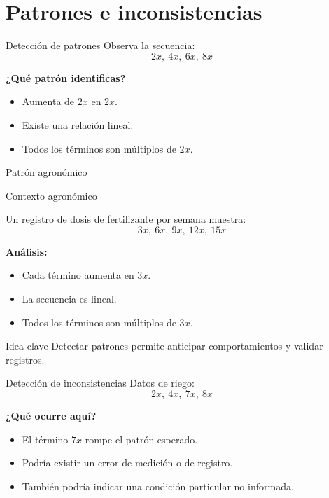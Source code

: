 \documentclass[handout,aspectratio=169,12pt]{beamer}
\newcommand{\IdeaClave}[1]{
	\begin{alertblock}{Idea clave}
		#1
	\end{alertblock}
}
\newcommand{\Agronomia}[1]{
	\begin{exampleblock}{Contexto agronómico}
		#1
	\end{exampleblock}
}
\begin{document}
	\section{Patrones e inconsistencias}
	\begin{frame}{Detección de patrones}
		Observa la secuencia:
		\[
		2x,\ 4x,\ 6x,\ 8x
		\]
		
		\pause
		\textbf{¿Qué patrón identificas?}
		\begin{itemize}
			\item Aumenta de \(2x\) en \(2x\).
			\pause
			\item Existe una relación lineal.
			\pause
			\item Todos los términos son múltiplos de \(2x\).
		\end{itemize}
	\end{frame}
	
	\begin{frame}{Patrón agronómico}
		\Agronomia{
			Un registro de dosis de fertilizante por semana muestra:
			\[
			3x,\ 6x,\ 9x,\ 12x,\ 15x
			\]
		}
		
		\pause
		\textbf{Análisis:}
		\begin{itemize}
			\item Cada término aumenta en \(3x\).
			\pause
			\item La secuencia es lineal.
			\pause
			\item Todos los términos son múltiplos de \(3x\).
		\end{itemize}
		
		\pause
		\IdeaClave{Detectar patrones permite anticipar comportamientos y validar registros.}
	\end{frame}
	
	\begin{frame}{Detección de inconsistencias}
		Datos de riego:
		\[
		2x,\ 4x,\ 7x,\ 8x
		\]
		
		\pause
		\textbf{¿Qué ocurre aquí?}
		\begin{itemize}
			\item El término \(7x\) rompe el patrón esperado.
			\pause
			\item Podría existir un error de medición o de registro.
			\pause
			\item También podría indicar una condición particular no informada.
		\end{itemize}
	\end{frame}
	
\end{document}
